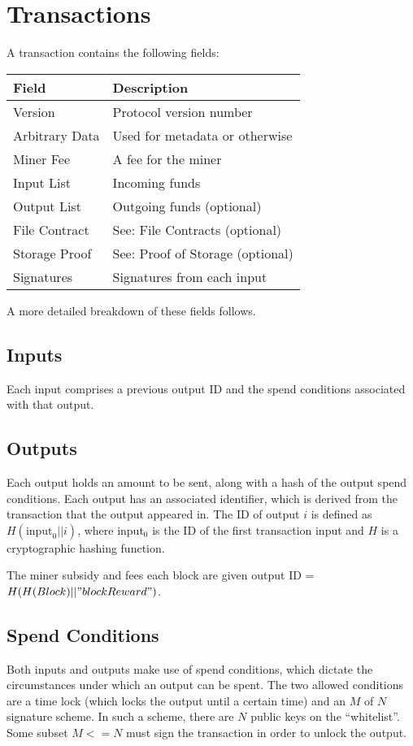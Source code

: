 \documentclass[twocolumn]{article}
\begin{document}
\section{Transactions}
A transaction contains the following fields:
\begin{tabular}{| l | l |}
	\hline
	\textbf{Field} & \textbf{Description} \\ \hline
	Version        & Protocol version number \\ \hline
	Arbitrary Data & Used for metadata or otherwise \\ \hline
	Miner Fee      & A fee for the miner \\ \hline
	Input List     & Incoming funds \\ \hline
	Output List    & Outgoing funds (optional) \\ \hline
	File Contract  & See: File Contracts (optional) \\ \hline
	Storage Proof  & See: Proof of Storage (optional) \\ \hline
	Signatures     & Signatures from each input \\ \hline
\end{tabular}

A more detailed breakdown of these fields follows.

\subsection{Inputs}
Each input comprises a previous output ID and the spend conditions associated with that output.

\subsection{Outputs}
Each output holds an amount to be sent, along with a hash of the output spend conditions.
Each output has an associated identifier, which is derived from the transaction that the output appeared in.
The ID of output $i$ is defined as $H(\text{input}_0 || i)$,
where input$_0$ is the ID of the first transaction input and $H$ is a cryptographic hashing function.

The miner subsidy and fees each block are given output ID = $H(H(Block) || "blockReward")$.

\subsection{Spend Conditions}
Both inputs and outputs make use of spend conditions, which dictate the circumstances under which an output can be spent.
The two allowed conditions are a time lock (which locks the output until a certain time) and an $M$ of $N$ signature scheme.
In such a scheme, there are $N$ public keys on the ``whitelist''.
Some subset $M <= N$ must sign the transaction in order to unlock the output. 
\end{document}
